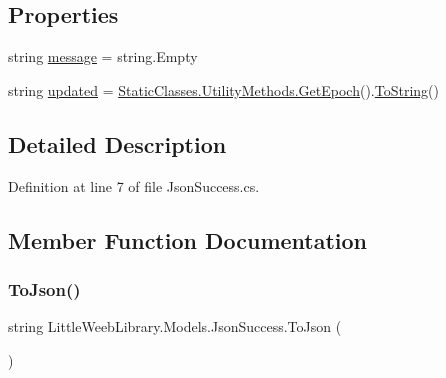\subsection*{Properties}
\begin{DoxyCompactItemize}
\item 
string \mbox{\hyperlink{class_little_weeb_library_1_1_models_1_1_json_success_a6ccf690286fe8d8e0e4040d2e7f0e708}{message}} = string.\+Empty
\item 
string \mbox{\hyperlink{class_little_weeb_library_1_1_models_1_1_json_success_a486c79938bb53ac4092683da49a07a18}{updated}} = \mbox{\hyperlink{class_little_weeb_library_1_1_static_classes_1_1_utility_methods_a12336d9e64983ddabaad8950486fafb2}{Static\+Classes.\+Utility\+Methods.\+Get\+Epoch}}().\mbox{\hyperlink{class_little_weeb_library_1_1_models_1_1_json_success_abd0bbcc176b7accbefc425a70816b12a}{To\+String}}()
\end{DoxyCompactItemize}


\subsection{Detailed Description}


Definition at line 7 of file Json\+Success.\+cs.



\subsection{Member Function Documentation}
\mbox{\label{class_little_weeb_library_1_1_models_1_1_json_success_a407103dc37a77aaf47a782296bab7518}} 
\subsubsection{\texorpdfstring{To\+Json()}{ToJson()}}
{\footnotesize\ttfamily string Little\+Weeb\+Library.\+Models.\+Json\+Success.\+To\+Json (\begin{DoxyParamCaption}{ }\end{DoxyParamCaption})}



